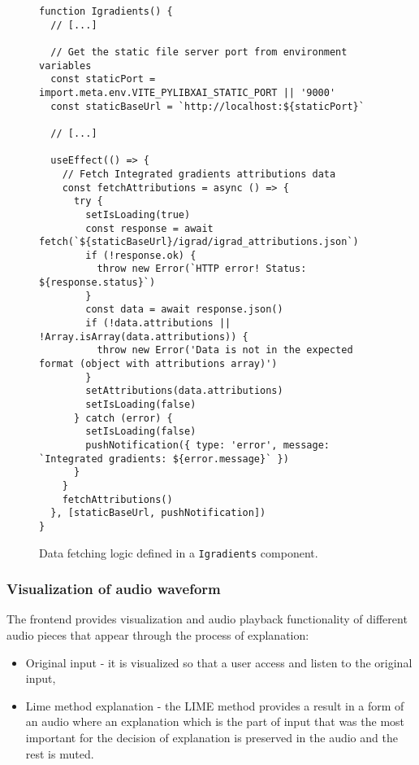 \documentclass[
    bindingoffset=5mm,  %
    footnoteindent=3mm, %
    hyphenation=true    %
]{src/wut-thesis}
\begin{document}
\begin{figure}%
\begin{verbatim}
function Igradients() {
  // [...]

  // Get the static file server port from environment variables
  const staticPort = import.meta.env.VITE_PYLIBXAI_STATIC_PORT || '9000'
  const staticBaseUrl = `http://localhost:${staticPort}`

  // [...]

  useEffect(() => {
    // Fetch Integrated gradients attributions data
    const fetchAttributions = async () => {
      try {
        setIsLoading(true)
        const response = await fetch(`${staticBaseUrl}/igrad/igrad_attributions.json`)
        if (!response.ok) {
          throw new Error(`HTTP error! Status: ${response.status}`)
        }
        const data = await response.json()
        if (!data.attributions || !Array.isArray(data.attributions)) {
          throw new Error('Data is not in the expected format (object with attributions array)')
        }
        setAttributions(data.attributions)
        setIsLoading(false)
      } catch (error) {
        setIsLoading(false)
        pushNotification({ type: 'error', message: `Integrated gradients: ${error.message}` })
      }
    }
    fetchAttributions()
  }, [staticBaseUrl, pushNotification])
}
\end{verbatim}
\caption{Data fetching logic defined in a \texttt{Igradients} component.}
\label{fig:IgradComponentDataFetching}
\end{figure}
    
\subsubsection{Visualization of audio waveform}

The frontend provides visualization and audio playback functionality of
different audio pieces that appear through the process of explanation:

\begin{itemize}
    \item Original input - it is visualized so that a user access and listen
          to the original input,
    \item Lime method explanation - the LIME method provides a result in a form of an audio
          where an explanation which is the part of input that was the most important for
          the decision of explanation is preserved in the audio and the rest is muted.
\end{itemize}
\end{document}
